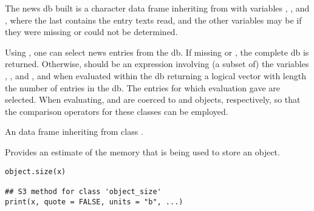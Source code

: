\begin{Details}
The news db built is a character data frame inheriting from
 with variables , ,
 and , where the last contains the entry texts
read, and the other variables may be  if they were missing or
could not be determined.

Using , one can select news entries from the db.  If
missing or , the complete db is returned.  Otherwise,
 should be an expression involving (a subset of) the
variables , ,  and
, and when evaluated within the db returning a logical
vector with length the number of entries in the db.  The entries for
which evaluation gave  are selected.  When evaluating,
 and  are coerced to
 and  objects,
respectively, so that the comparison operators for these classes can
be employed.
\end{Details}
%
\begin{Value}
An data frame inheriting from class .
\end{Value}
%
\begin{Examples}
\end{Examples}
%
\begin{Description}\relax
Provides an estimate of the memory that is being used to store an \R{} object.
\end{Description}
%
\begin{Usage}
\begin{verbatim}
object.size(x)

## S3 method for class 'object_size'
print(x, quote = FALSE, units = "b", ...)
\end{verbatim}
\end{Usage}

